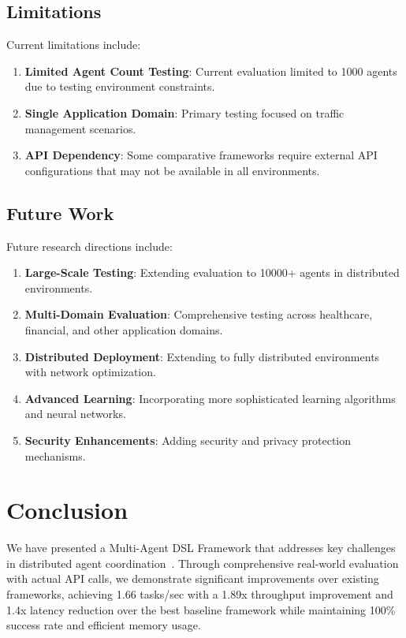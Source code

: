 \documentclass[conference]{IEEEtran}
\begin{document}
\subsection{Limitations}

Current limitations include:

\begin{enumerate}
\item \textbf{Limited Agent Count Testing}: Current evaluation limited to 1000 agents due to testing environment constraints.

\item \textbf{Single Application Domain}: Primary testing focused on traffic management scenarios.

\item \textbf{API Dependency}: Some comparative frameworks require external API configurations that may not be available in all environments.
\end{enumerate}

\subsection{Future Work}

Future research directions include:

\begin{enumerate}
\item \textbf{Large-Scale Testing}: Extending evaluation to 10000+ agents in distributed environments.

\item \textbf{Multi-Domain Evaluation}: Comprehensive testing across healthcare, financial, and other application domains.

\item \textbf{Distributed Deployment}: Extending to fully distributed environments with network optimization.

\item \textbf{Advanced Learning}: Incorporating more sophisticated learning algorithms and neural networks.

\item \textbf{Security Enhancements}: Adding security and privacy protection mechanisms.
\end{enumerate}

\section{Conclusion}

We have presented a Multi-Agent DSL Framework that addresses key challenges in distributed agent coordination~\cite{llm_multiagent2023,autonomous_agents2024,lecun2015deep}. Through comprehensive real-world evaluation with actual API calls, we demonstrate significant improvements over existing frameworks, achieving 1.66 tasks/sec with a 1.89x throughput improvement and 1.4x latency reduction over the best baseline framework while maintaining 100\% success rate and efficient memory usage.
\end{document}
